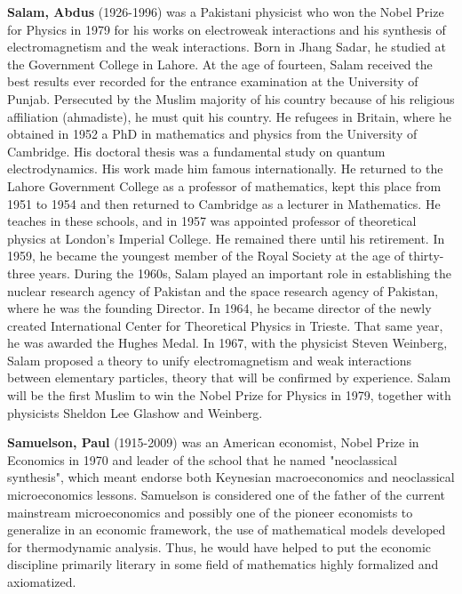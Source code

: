 \textbf{Salam, Abdus} (1926-1996) was a Pakistani physicist who won the Nobel Prize for Physics in 1979 for his works on electroweak interactions and his synthesis of electromagnetism and the weak interactions. Born in Jhang Sadar, he studied at the Government College in Lahore. At the age of fourteen, Salam received the best results ever recorded for the entrance examination at the University of Punjab. Persecuted by the Muslim majority of his country because of his religious affiliation (ahmadiste), he must quit his country. He refugees in Britain, where he obtained in 1952 a PhD in mathematics and physics from the University of Cambridge. His doctoral thesis was a fundamental study on quantum electrodynamics. His work made him famous internationally. He returned to the Lahore Government College as a professor of mathematics, kept this place from 1951 to 1954 and then returned to Cambridge as a lecturer in Mathematics. He teaches in these schools, and in 1957 was appointed professor of theoretical physics at London's Imperial College. He remained there until his retirement. In 1959, he became the youngest member of the Royal Society at the age of thirty-three years. During the 1960s, Salam played an important role in establishing the nuclear research agency of Pakistan and the space research agency of Pakistan, where he was the founding Director. In 1964, he became director of the newly created International Center for Theoretical Physics in Trieste. That same year, he was awarded the Hughes Medal. In 1967, with the physicist Steven Weinberg, Salam proposed a theory to unify electromagnetism and weak interactions between elementary particles, theory that will be confirmed by experience. Salam will be the first Muslim to win the Nobel Prize for Physics in 1979, together with physicists Sheldon Lee Glashow and Weinberg.

\textbf{Samuelson, Paul} (1915-2009) was an American economist, Nobel Prize in Economics in 1970 and leader of the school that he named "neoclassical synthesis", which meant endorse both Keynesian macroeconomics and neoclassical microeconomics lessons. Samuelson is considered one of the father of the current mainstream microeconomics and possibly one of the pioneer economists to generalize in an economic framework, the use of mathematical models developed for thermodynamic analysis. Thus, he would have helped to put the economic discipline primarily literary in some field of mathematics highly formalized and axiomatized.

